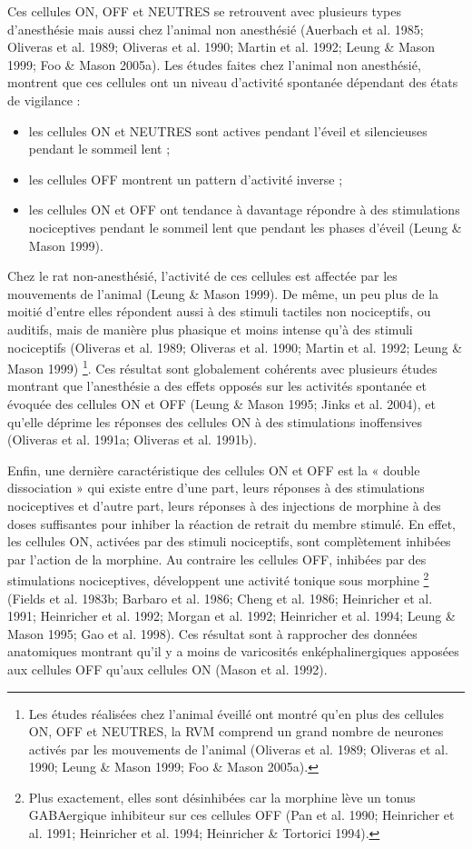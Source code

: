 \documentclass[a4paper,12pt,twoside]{report}
\begin{document}
Ces cellules ON, OFF et NEUTRES se retrouvent avec plusieurs types d’anesthésie mais aussi chez l’animal non anesthésié (Auerbach et al. 1985; Oliveras et al. 1989; Oliveras et al. 1990; Martin et al. 1992; Leung \& Mason 1999; Foo \& Mason 2005a). Les études faites chez l’animal non anesthésié, montrent que ces cellules ont un niveau d’activité spontanée dépendant des états de vigilance : 

\begin{itemize}
\item les cellules ON et NEUTRES sont actives pendant l’éveil et silencieuses pendant le sommeil lent ;
\item les cellules OFF montrent un pattern d’activité inverse ;
\item les cellules ON et OFF ont tendance à davantage répondre à des stimulations nociceptives pendant le sommeil lent que pendant les phases d’éveil (Leung \& Mason 1999). \end{itemize}

Chez le rat non-anesthésié, l’activité de ces cellules est affectée par les mouvements de l’animal (Leung \& Mason 1999). De même, un peu plus de la moitié d’entre elles répondent aussi à des stimuli tactiles non nociceptifs, ou auditifs, mais de manière plus phasique et moins intense qu’à des stimuli nociceptifs (Oliveras et al. 1989; Oliveras et al. 1990; Martin et al. 1992; Leung \& Mason 1999)
\footnote{Les études réalisées chez l’animal éveillé ont montré qu’en plus des cellules ON, OFF et NEUTRES, la RVM comprend un grand nombre de neurones activés par les mouvements de l’animal (Oliveras et al. 1989; Oliveras et al. 1990; Leung \& Mason 1999; Foo \& Mason 2005a).}. 
Ces résultat sont globalement cohérents avec plusieurs études montrant que l’anesthésie a des effets opposés sur les activités spontanée et évoquée des cellules ON et OFF (Leung \& Mason 1995; Jinks et al. 2004), et qu’elle déprime les réponses des cellules ON à des stimulations inoffensives (Oliveras et al. 1991a; Oliveras et al. 1991b).

Enfin, une dernière caractéristique des cellules ON et OFF est la « double dissociation » qui existe entre d’une part, leurs réponses à des stimulations nociceptives et d’autre part, leurs réponses à des injections de morphine à des doses suffisantes pour inhiber la réaction de retrait du membre stimulé. En effet, les cellules ON, activées par des stimuli nociceptifs, sont complètement inhibées par l’action de la morphine. Au contraire les cellules OFF, inhibées par des stimulations nociceptives, développent une activité tonique sous morphine
\footnote{Plus exactement, elles sont désinhibées car la morphine lève un tonus GABAergique inhibiteur sur ces cellules OFF (Pan et al. 1990; Heinricher et al. 1991; Heinricher et al. 1994; Heinricher \& Tortorici 1994).} 
(Fields et al. 1983b; Barbaro et al. 1986; Cheng et al. 1986; Heinricher et al. 1991; Heinricher et al. 1992; Morgan et al. 1992; Heinricher et al. 1994; Leung \& Mason 1995; Gao et al. 1998). Ces résultat sont à rapprocher des données anatomiques montrant qu’il y a moins de varicosités enképhalinergiques apposées aux cellules OFF qu’aux cellules ON (Mason et al. 1992).
\end{document}
